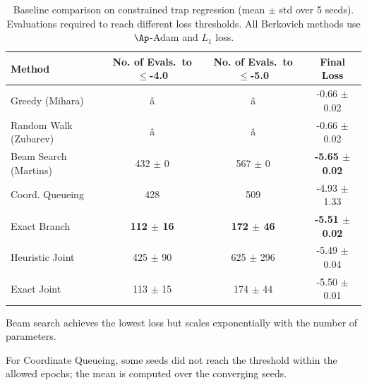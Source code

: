 \begin{table}[ht]
\centering
\small
\begin{threeparttable}
\caption{Baseline comparison on constrained trap regression (mean $\pm$ std over 5 seeds). Evaluations required to reach different loss thresholds. All Berkovich methods use $\Ap$-Adam and $L_1$ loss.}
\label{tab:baseline_comparison}
\begin{tabular}{@{}lccc@{}}
\toprule
\textbf{Method} & \textbf{No. of Evals.\ to $\le$-4.0} & \textbf{No. of Evals.\ to $\le$-5.0} & \textbf{Final Loss} \\
\midrule
Greedy (Mihara) & â & â & -0.66 $\pm$ 0.02 \\
Random Walk (Zubarev) & â & â & -0.66 $\pm$ 0.02 \\
Beam Search (Martins)\tnote{a} & 432 $\pm$ 0 & 567 $\pm$ 0 & \textbf{-5.65 $\pm$ 0.02} \\
\midrule
\addlinespace[2pt]
Coord. Queueing & 428\tnote{*} & 509\tnote{*} & -4.93 $\pm$ 1.33 \\
Exact Branch & \textbf{112 $\pm$ 16} & \textbf{172 $\pm$ 46} & \textbf{-5.51 $\pm$ 0.02} \\
Heuristic Joint & 425 $\pm$ 90 & 625 $\pm$ 296 & -5.49 $\pm$ 0.04 \\
Exact Joint & 113 $\pm$ 15 & 174 $\pm$ 44 & -5.50 $\pm$ 0.01 \\
\bottomrule
\end{tabular}
\begin{tablenotes}
\footnotesize
\item[a] Beam search achieves the lowest loss but scales exponentially with the number of parameters.
\item[*] For Coordinate Queueing, some seeds did not reach the threshold within the allowed epochs; the mean is computed over the converging seeds.
\end{tablenotes}
\end{threeparttable}
\end{table}




